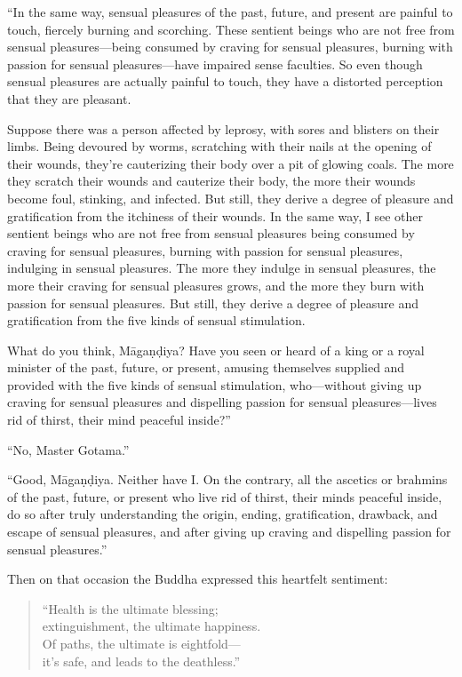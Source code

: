 \documentclass[12pt,openany]{book}%
\begin{document}
“In the same way, sensual pleasures of the past, future, and present are painful to touch, fiercely burning and scorching. These sentient beings who are not free from sensual pleasures—being consumed by craving for sensual pleasures, burning with passion for sensual pleasures—have impaired sense faculties. So even though sensual pleasures are actually painful to touch, they have a distorted perception that they are pleasant. 

Suppose there was a person affected by leprosy, with sores and blisters on their limbs. Being devoured by worms, scratching with their nails at the opening of their wounds, they’re cauterizing their body over a pit of glowing coals. The more they scratch their wounds and cauterize their body, the more their wounds become foul, stinking, and infected. But still, they derive a degree of pleasure and gratification from the itchiness of their wounds. In the same way, I see other sentient beings who are not free from sensual pleasures being consumed by craving for sensual pleasures, burning with passion for sensual pleasures, indulging in sensual pleasures. The more they indulge in sensual pleasures, the more their craving for sensual pleasures grows, and the more they burn with passion for sensual pleasures. But still, they derive a degree of pleasure and gratification from the five kinds of sensual stimulation. 

What do you think, \textsanskrit{Māgaṇḍiya}? Have you seen or heard of a king or a royal minister of the past, future, or present, amusing themselves supplied and provided with the five kinds of sensual stimulation, who—without giving up craving for sensual pleasures and dispelling passion for sensual pleasures—lives rid of thirst, their mind peaceful inside?” 

“No, Master Gotama.” 

“Good, \textsanskrit{Māgaṇḍiya}. Neither have I. On the contrary, all the ascetics or brahmins of the past, future, or present who live rid of thirst, their minds peaceful inside, do so after truly understanding the origin, ending, gratification, drawback, and escape of sensual pleasures, and after giving up craving and dispelling passion for sensual pleasures.” 

Then on that occasion the Buddha expressed this heartfelt sentiment: 

\begin{verse}%
“Health is the ultimate blessing; \\
extinguishment, the ultimate happiness. \\
Of paths, the ultimate is eightfold—\\
it’s safe, and leads to the deathless.” 

%
\end{verse}
\end{document}
